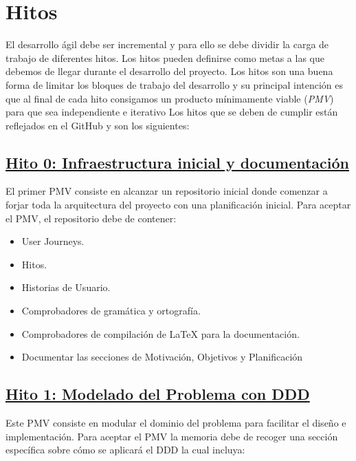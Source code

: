 \section{Hitos}
El desarrollo ágil debe ser incremental y para ello se debe dividir la carga de trabajo de diferentes hitos.
Los hitos pueden definirse como metas a las que debemos de llegar durante el desarrollo del proyecto.
Los hitos son una buena forma de limitar los bloques de trabajo del desarrollo y su principal intención es que
al final de cada hito consigamos un producto mínimamente viable (\textit{PMV}) para que sea independiente e iterativo
Los hitos que se deben de cumplir están reflejados en el GitHub y son los siguientes:

\subsection*{\href{https://github.com/RubenDelgadoPareja/TFG-Triage-Inteligente-Consulta-Medica/milestone/1}{Hito 0: Infraestructura inicial y documentación}}

El primer PMV consiste en alcanzar un repositorio inicial donde comenzar a forjar toda la arquitectura del proyecto con una planificación inicial.
Para aceptar el PMV, el repositorio debe de contener:

\begin{itemize}
    \item{User Journeys.}
    \item{Hitos.}
    \item{Historias de Usuario.}
    \item{Comprobadores de gramática y ortografía.}
    \item{Comprobadores de compilación de LaTeX para la documentación.}
    \item{Documentar las secciones de Motivación, Objetivos y Planificación}
\end{itemize}

\subsection*{\href{https://github.com/RubenDelgadoPareja/TFG-Triage-Inteligente-Consulta-Medica/milestone/7}{Hito 1: Modelado del Problema con DDD}}

Este PMV consiste en modular el dominio del problema para facilitar el diseño e implementación.
Para aceptar el PMV la memoria debe de recoger una sección específica sobre cómo se aplicará el DDD la cual incluya:

